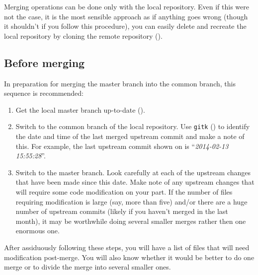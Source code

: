 \documentclass[a4paper,oneside,11pt]{article}
\begin{document}
Merging operations can be done only with the local repository. Even if this were not the case, it is the most sensible approach as if anything goes wrong (though it shouldn't if you follow this procedure), you can easily delete and recreate the local repository by cloning the remote repository ().

\subsection{Before merging}\label{ssec:bm}
In preparation for merging the master branch into the common branch, this sequence is recommended:
\begin{enumerate}
  \item Get the local master branch up-to-date ().
  \item Switch to the common branch of the local repository. Use \texttt{gitk} () to identify the date and time of the last merged upstream commit and make a note of this. For example, the last upstream commit shown on  is ``\textit{2014-02-13 15:55:28}''.
  \item Switch to the master branch. Look carefully at each of the upstream changes that have been made since this date. Make note of any upstream changes that will require some code modification on your part. If the number of files requiring modification is large (say, more than five) and\slash or there are a huge number of upstream commits (likely if you haven't merged in the last month), it may be worthwhile doing several smaller merges rather then one enormous one.
\end{enumerate}
After assiduously following these steps, you will have a list of files that will need modification post-merge. You will also know whether it would be better to do one merge or to divide the merge into several smaller ones.
\end{document}
